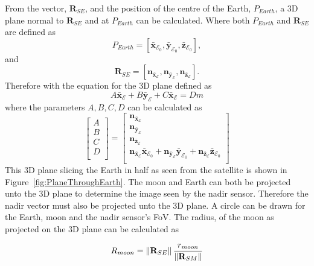 From the vector, $\mathbf{R}_{SE}$, and the position of the centre of the Earth, $P_{Earth}$, a 3D plane normal to $\mathbf{R}_{SE}$ and at $P_{Earth}$ can be calculated. Where both $P_{Earth}$ and $\mathbf{R}_{SE}$ are defined as
\begin{equation}
	P_{Earth} = [\bar{\mathbf{x}}_{\mathcal{E}_0}, \bar{\mathbf{y}}_{\mathcal{E}_0}, \bar{\mathbf{z}}_{\mathcal{E}_0}],
\end{equation}
and  
\begin{equation}
	\mathbf{R}_{SE} = [\mathbf{n}_{\bar{\mathbf{x}}_{\mathcal{E}}}, \mathbf{n}_{\bar{\mathbf{y}}_{\mathcal{E}}}, \mathbf{n}_{\bar{\mathbf{z}}_{\mathcal{E}}}].
\end{equation}
Therefore with the equation for the 3D plane defined as 
\begin{equation}
A\bar{\mathbf{x}}_{\mathcal{E}} + B\bar{\mathbf{y}}_{\mathcal{E}} + C{\bar{\mathbf{x}}_{\mathcal{E}}} = Dm
\end{equation}
where the parameters $A, B, C, D$ can be calculated as
\begin{equation}
\begin{bmatrix}
	A\\
	B\\
	C\\
	D\\
\end{bmatrix} = \begin{bmatrix}
\mathbf{n}_{\bar{\mathbf{x}}_{\mathcal{E}}} \\ \mathbf{n}_{\bar{\mathbf{y}}_{\mathcal{E}}} \\ \mathbf{n}_{\bar{\mathbf{z}}_{\mathcal{E}}} \\
\mathbf{n}_{\bar{\mathbf{x}}_{\mathcal{E}}}\bar{\mathbf{x}}_{\mathcal{E}_0} + \mathbf{n}_{\bar{\mathbf{y}}_{\mathcal{E}}}\bar{\mathbf{y}}_{\mathcal{E}_0} + \mathbf{n}_{\bar{\mathbf{z}}_{\mathcal{E}}}\bar{\mathbf{z}}_{\mathcal{E}_0} \\
\end{bmatrix}
\end{equation}
This 3D plane slicing the Earth in half as seen from the satellite is shown in Figure~\ref{fig:PlaneThroughEarth}. The moon and Earth can both be projected unto the 3D plane to determine the image seen by the nadir sensor. Therefore the nadir vector must also be projected unto the 3D plane. A circle can be drawn for the Earth, moon and the nadir sensor's FoV. The radius, of the moon as projected on the 3D plane can be calculated as 

\begin{equation}
	R_{moon} = \left\lVert\mathbf{R}_{SE}\right\rVert \frac{r_{moon}}{\left\lVert\mathbf{R}_{SM}\right\rVert}
\end{equation}

